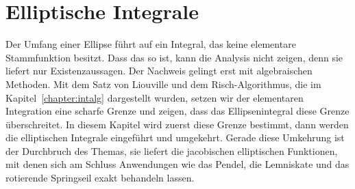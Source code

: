 %
%
%
%
\chapter{Elliptische Integrale}\label{chapter:elliptisch}
\begin{refsection}

%
%

\noindent
Der Umfang einer Ellipse führt auf ein Integral, das keine
elementare Stammfunktion besitzt. 
Dass das so ist, kann die Analysis nicht zeigen, denn sie liefert
nur Existenzaussagen.
Der Nachweis gelingt erst mit algebraischen Methoden.
Mit dem Satz von Liouville und dem Risch-Algorithmus, die im
Kapitel~\ref{chapter:intalg} dargestellt wurden, setzen wir
der elementaren Integration eine scharfe Grenze und zeigen, dass
das Ellipsenintegral diese Grenze überschreitet.
In diesem Kapitel wird zuerst diese Grenze bestimmt, dann werden
die elliptischen Integrale eingeführt und umgekehrt.
Gerade diese Umkehrung ist der Durchbruch des Themas, sie liefert
die jacobischen elliptischen Funktionen, mit denen sich am Schluss
Anwendungen wie das Pendel, die Lemniskate und das rotierende
Springseil exakt behandeln lassen.







\printbibliography[heading=subbibliography]
\end{refsection}
